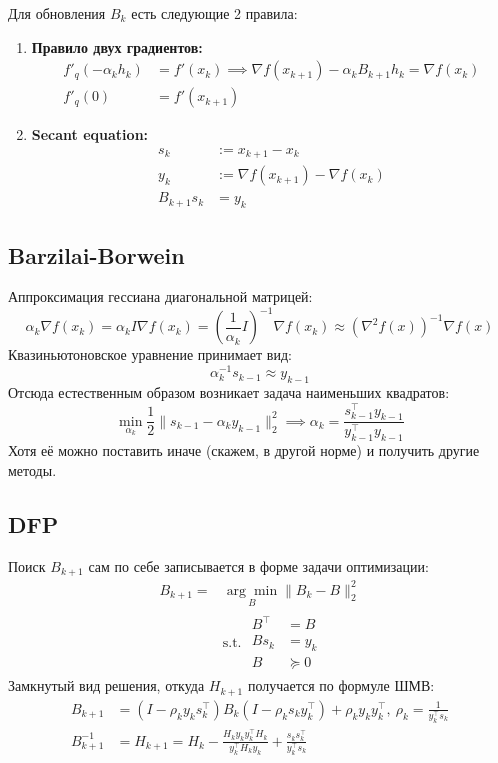 \documentclass[11pt,a4paper]{report}
\theoremstyle{definition}
\theoremstyle{definition}
\theoremstyle{definition}
\begin{document}
	Для обновления $ B_k $ есть следующие 2 правила:
	\begin{enumerate}
		\item \textbf{Правило двух градиентов:} 
			\begin{align*}
				f'_{q}(-\alpha_k h_k) &= f'(x_k) \implies \nabla f(x_{k+1}) - \alpha_k B_{k+1} h_k = \nabla f(x_k) \\
				f'_{q}(0) &= f'(x_{k+1})
			\end{align*}
		\item \textbf{Secant equation:}
		\begin{align*}
			s_{k} &:= x_{k+1} - x_{k}\\
			y_{k} &:= \nabla f(x_{k+1}) - \nabla f(x_k)\\
			B_{k+1} s_k &= y_k
		\end{align*}
	\end{enumerate}
	\subsection{Barzilai-Borwein}
	Аппроксимация гессиана диагональной матрицей:
	$$
		\alpha_k \nabla f(x_k) = \alpha_k I \nabla f(x_k) = \left ( \frac{1}{\alpha_k} I \right )^{-1} \nabla f(x_k) \approx (\nabla^2 f(x))^{-1} \nabla f(x)
	$$
	Квазиньютоновское уравнение принимает вид:
	$$
		\alpha_k^{-1} s_{k-1} \approx y_{k-1}
	$$
	Отсюда естественным образом возникает задача наименьших квадратов:
	$$
		\min_{\alpha_k} \frac{1}{2} \| s_{k-1} - \alpha_{k} y_{k-1} \|_2^2 \implies \alpha_k = \frac{s_{k-1}^{\top} y_{k-1}}{y_{k-1}^{\top} y_{k-1}}
	$$
	Хотя её можно поставить иначе (скажем, в другой норме) и получить другие методы.
	\subsection{DFP}
	Поиск $ B_{k+1} $ сам по себе записывается в форме задачи оптимизации:
	\begin{align*}
		B_{k+1} = &\underset{B}{\arg\min} \| B_k - B \|_2^2\\
							&\text{s.t. } 
							\begin{aligned} 
								B^{\top} &= B\\ 
								B s_k &= y_k\\
								B &\succeq 0
							\end{aligned}
	\end{align*}
	Замкнутый вид решения, откуда $ H_{k+1} $ получается по формуле ШМВ:
	\begin{align*}
		B_{k+1} &= (I - \rho_k y_k s_k^\top) B_k (I - \rho_k s_k y_k^{\top}) + \rho_k y_k y_k^{\top},\ \rho_k = \frac{1}{y_k^\top s_k}\\
		B_{k+1}^{-1} &= H_{k+1} = H_k - \frac{H_k y_k y_k^{\top} H_k}{y_k^\top H_k y_k} + \frac{s_k s_k^\top}{y_k^\top s_k}
	\end{align*}
\end{document}
